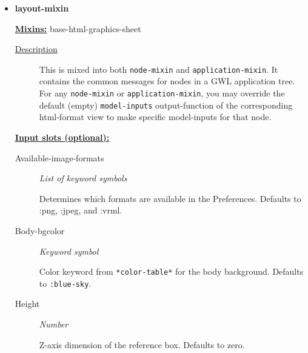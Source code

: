 \documentclass [11pt]{book}
\begin{document}
\begin{itemize}
\begin{description}
\end{description}









\item {}
\label{prim:layout-mixin}
\textbf{layout-mixin}


\textbf{
\underline{Mixins:}} base-html-graphics-sheet





\begin{description}

\item [
\underline{Description}]


This is mixed into both \texttt{node-mixin} and \texttt{application-mixin}. It contains the common
messages for nodes in a GWL application tree. For any \texttt{node-mixin} or \texttt{application-mixin}, you may override the default (empty)
\texttt{model-inputs} output-function of the corresponding html-format view to make specific model-inputs for that node.



\end{description}








\textbf{
\underline{Input slots (optional):}}

\begin{description}

\item [Available-image-formats]
\emph{List of keyword symbols}

 Determines which formats are available in the Preferences. Defaults to :png, :jpeg, and :vrml.




\item [Body-bgcolor]
\emph{Keyword symbol}

 Color keyword from \texttt{*color-table*} for the body background. Defaults to \texttt{:blue-sky}.




\item [Height]
\emph{Number}

 Z-axis dimension of the reference box. Defaults to zero.





\end{description}
\end{itemize}
\end{document}
